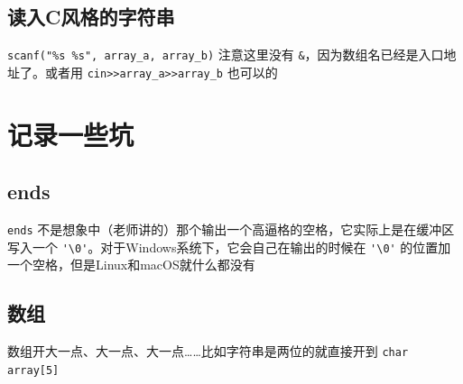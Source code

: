 \documentclass[]{report}
\begin{document}
	\section{读入C风格的字符串}
		\verb|scanf("%s %s", array_a, array_b)| 注意这里没有 \verb|&|，因为数组名已经是入口地址了。或者用 \verb|cin>>array_a>>array_b| 也可以的

	\chapter{记录一些坑}
	\section{ends}
		\verb|ends| 不是想象中（老师讲的）那个输出一个高逼格的空格，它实际上是在缓冲区写入一个 \verb|'\0'|。对于Windows系统下，它会自己在输出的时候在 \verb|'\0'| 的位置加一个空格，但是Linux和macOS就什么都没有
	\section{数组}
		数组开大一点、大一点、大一点……比如字符串是两位的就直接开到 \verb|char array[5]|
\end{document}
